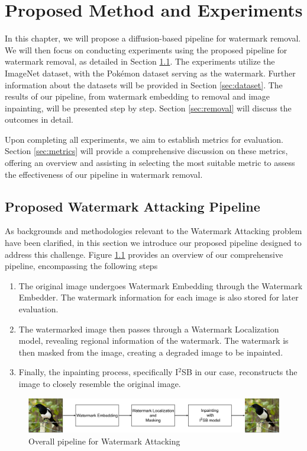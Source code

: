 \chapter{Proposed Method and Experiments}
\label{chap:experiment}

In this chapter, we will propose a diffusion-based pipeline for watermark removal. We will then focus on conducting experiments using the proposed pipeline for watermark removal, as detailed in Section \ref{sec:pipeline}. The experiments utilize the ImageNet dataset, with the Pokémon dataset serving as the watermark. Further information about the datasets will be provided in Section \ref{sec:dataset}. The results of our pipeline, from watermark embedding to removal and image inpainting, will be presented step by step. Section \ref{sec:removal} will discuss the outcomes in detail.

Upon completing all experiments, we aim to establish metrics for evaluation. Section \ref{sec:metrics} will provide a comprehensive discussion on these metrics, offering an overview and assisting in selecting the most suitable metric to assess the effectiveness of our pipeline in watermark removal.

\section{Proposed Watermark Attacking Pipeline}
\label{sec:pipeline}
As backgrounds and methodologies relevant to the Watermark Attacking problem have been clarified, in this section we introduce our proposed pipeline designed to address this challenge. Figure \ref{figure:overall_pipeline} provides an overview of our comprehensive pipeline, encompassing the following steps
\begin{enumerate}
 \item The original image undergoes Watermark Embedding through the Watermark Embedder. The watermark information for each image is also stored for later evaluation.
 \item The watermarked image then passes through a Watermark Localization model, revealing regional information of the watermark. The watermark is then masked from the image, creating a degraded image to be inpainted.
 \item Finally, the inpainting process, specifically I$^2$SB in our case, reconstructs the image to closely resemble the original image.
\end{enumerate}
\begin{figure}[t]
 \centering
 \includegraphics[width = \textwidth]{img/overall.png}
 \caption{Overall pipeline for Watermark Attacking}
 \label{figure:overall_pipeline}
\end{figure}

